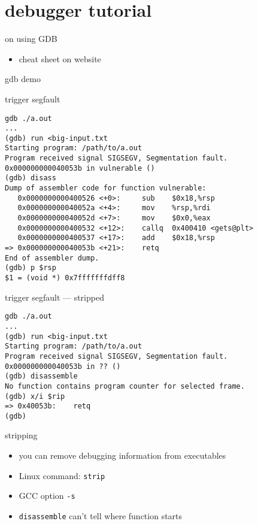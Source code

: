 \section{debugger tutorial}

\begin{frame}{on using GDB}
    \begin{itemize}
    \item cheat sheet on website
    \end{itemize}
\end{frame}

\begin{frame}{gdb demo}
\end{frame}

\begin{frame}[fragile,label=trigSeg]{trigger segfault}
\begin{Verbatim}[fontsize=\fontsize{10}{11}\selectfont]
gdb ./a.out
...
(gdb) run <big-input.txt
Starting program: /path/to/a.out 
Program received signal SIGSEGV, Segmentation fault.
0x000000000040053b in vulnerable ()
(gdb) disass
Dump of assembler code for function vulnerable:
   0x0000000000400526 <+0>:     sub    $0x18,%rsp
   0x000000000040052a <+4>:     mov    %rsp,%rdi
   0x000000000040052d <+7>:     mov    $0x0,%eax
   0x0000000000400532 <+12>:    callq  0x400410 <gets@plt>
   0x0000000000400537 <+17>:    add    $0x18,%rsp
=> 0x000000000040053b <+21>:    retq   
End of assembler dump.
(gdb) p $rsp 
$1 = (void *) 0x7fffffffdff8
\end{Verbatim}
\end{frame}

\begin{frame}[fragile,label=trigSegStripped]{trigger segfault --- stripped}
\begin{Verbatim}[fontsize=\fontsize{10}{11}\selectfont]
gdb ./a.out
...
(gdb) run <big-input.txt
Starting program: /path/to/a.out 
Program received signal SIGSEGV, Segmentation fault.
0x000000000040053b in ?? ()
(gdb) disassemble
No function contains program counter for selected frame.
(gdb) x/i $rip
=> 0x40053b:    retq   
(gdb)
\end{Verbatim}
\end{frame}

\begin{frame}{stripping}
\begin{itemize}
\item you can remove debugging information from executables
\item Linux command: \texttt{strip}
\item GCC option \texttt{-s}
\item \texttt{disassemble} can't tell where function starts
\end{itemize}
\end{frame}

